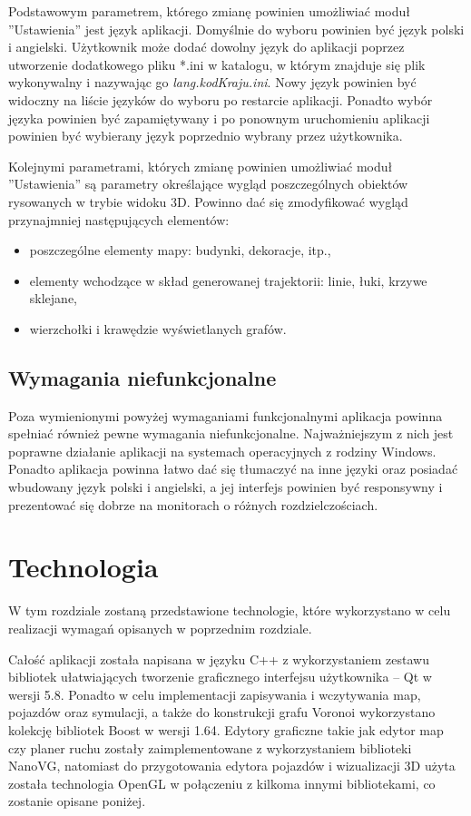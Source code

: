 \documentclass[a4paper,11pt,twoside]{report}
\theoremstyle{definition}
\begin{document}
Podstawowym parametrem, którego zmianę powinien umożliwiać moduł ''Ustawienia'' jest język aplikacji. Domyślnie do wyboru powinien być język polski i angielski. Użytkownik może dodać dowolny język do aplikacji poprzez utworzenie dodatkowego pliku *.ini w katalogu, w którym znajduje się plik wykonywalny i nazywając go \textit{lang.kodKraju.ini}. Nowy język powinien być widoczny na liście języków do wyboru po restarcie aplikacji. Ponadto wybór języka powinien być zapamiętywany i po ponownym uruchomieniu aplikacji powinien być wybierany język poprzednio wybrany przez użytkownika.

Kolejnymi parametrami, których zmianę powinien umożliwiać moduł ''Ustawienia'' są parametry określające wygląd poszczególnych obiektów rysowanych w trybie widoku 3D. Powinno dać się zmodyfikować wygląd przynajmniej następujących elementów:
\begin{itemize}
	\item poszczególne elementy mapy: budynki, dekoracje, itp.,
	\item elementy wchodzące w skład generowanej trajektorii: linie, łuki, krzywe sklejane,
	\item wierzchołki i krawędzie wyświetlanych grafów.
\end{itemize}

\section{Wymagania niefunkcjonalne}

Poza wymienionymi powyżej wymaganiami funkcjonalnymi aplikacja powinna spełniać również pewne wymagania niefunkcjonalne. Najważniejszym z nich jest poprawne działanie aplikacji na systemach operacyjnych z rodziny Windows. Ponadto aplikacja powinna łatwo dać się tłumaczyć na inne języki oraz posiadać wbudowany język polski i angielski, a jej interfejs powinien być responsywny i prezentować się dobrze na monitorach o różnych rozdzielczościach.

\chapter{Technologia}

W tym rozdziale zostaną przedstawione technologie, które wykorzystano w celu realizacji wymagań opisanych w poprzednim rozdziale.

Całość aplikacji została napisana w języku C++ z wykorzystaniem zestawu bibliotek ułatwiających tworzenie graficznego interfejsu użytkownika – Qt w wersji 5.8. Ponadto w celu implementacji zapisywania i wczytywania map, pojazdów oraz symulacji, a także do konstrukcji grafu Voronoi wykorzystano kolekcję bibliotek Boost w wersji 1.64. Edytory graficzne takie jak edytor map czy planer ruchu zostały zaimplementowane z wykorzystaniem biblioteki NanoVG, natomiast do przygotowania edytora pojazdów i wizualizacji 3D użyta została technologia OpenGL w połączeniu z kilkoma innymi bibliotekami, co zostanie opisane poniżej. 
\end{document}
